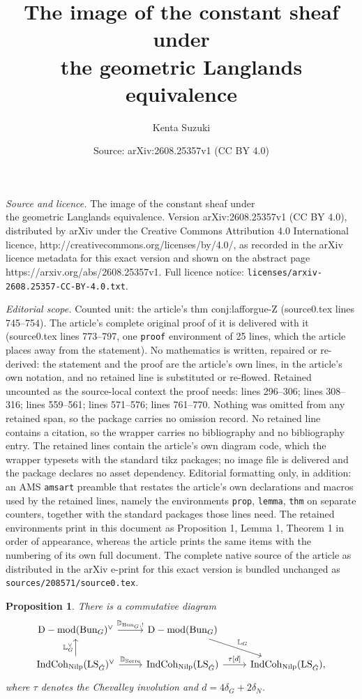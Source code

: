 \documentclass[10pt,a4paper]{amsart}
\title{The image of the constant sheaf under\\ the geometric Langlands equivalence}
\author{Kenta Suzuki}
\date{Source: arXiv:2608.25357v1 (CC BY 4.0)}
\newtheorem{prop}{Proposition}
\newcommand{\Bun}{{\mathrm{Bun}}}
\DeclareMathOperator{\Dmod}{D-mod}
\DeclareMathOperator{\IndCoh}{IndCoh}
\DeclareMathOperator{\LS}{LS}
\newcommand{\Nilp}{\mathrm{Nilp}}
\begin{document}
\maketitle

\noindent\emph{Source and licence.} The image of the constant sheaf under\\ the geometric Langlands equivalence. Version arXiv:2608.25357v1 (CC BY 4.0), distributed by arXiv under the Creative Commons Attribution 4.0 International licence, http://creativecommons.org/licenses/by/4.0/, as recorded in the arXiv licence metadata for this exact version and shown on the abstract page https://arxiv.org/abs/2608.25357v1. Full licence notice: \texttt{licenses/arxiv-2608.25357-CC-BY-4.0.txt}.\par\smallskip

\noindent\textit{Editorial scope.} Counted unit: the article's thm conj:lafforgue-Z (source0.tex lines 745--754). The article's complete original proof of it is delivered with it (source0.tex lines 773--797, one \texttt{proof} environment of 25 lines, which the article places away from the statement). No mathematics is written, repaired or re-derived: the statement and the proof are the article's own lines, in the article's own notation, and no retained line is substituted or re-flowed.  Retained uncounted as the source-local context the proof needs: lines 296--306; lines 308--316; lines 559--561; lines 571--576; lines 761--770.  Nothing was omitted from any retained span, so the package carries no omission record.  No retained line contains a citation, so the wrapper carries no bibliography and no bibliography entry.  The retained lines contain the article's own diagram code, which the wrapper typesets with the standard tikz packages; no image file is delivered and the package declares no asset dependency.  Editorial formatting only, in addition: an AMS \texttt{amsart} preamble that restates the article's own declarations and macros used by the retained lines, namely the environments \texttt{prop}, \texttt{lemma}, \texttt{thm} on separate counters, together with the standard packages those lines need.  The retained environments print in this document as Proposition 1, Lemma 1, Theorem 1 in order of appearance, whereas the article prints the same items with the numbering of its own full document.  The complete native source of the article as distributed in the arXiv e-print for this exact version is bundled unchanged as \texttt{sources/208571/source0.tex}.
\begin{prop}
\label{lem:duality-intertwined}
    There is a commutative diagram
    \[
    \begin{tikzcd}
        \Dmod(\Bun_G)^\vee\arrow{r}{\mathbb D_{\Bun_G,!}}&\Dmod(\Bun_G)\arrow{dr}{\mathbb L_G}\\
        \IndCoh_\Nilp(\LS_{\check G})^\vee\arrow{r}{\mathbb D_{\mathrm{Serre}}}\arrow{u}{\mathbb L_G^\vee}&\IndCoh_\Nilp(\LS_{\check G})\arrow{r}{\tau[d]}&\IndCoh_\Nilp(\LS_{\check G}),
    \end{tikzcd}
    \]
    where $\tau$ denotes the Chevalley involution and $d=4\delta_G+2\delta_N$. 
\end{prop}
\end{document}
